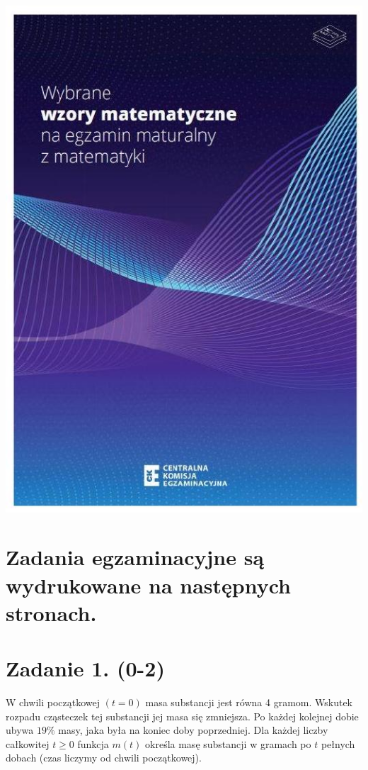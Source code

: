 \documentclass[10pt]{article}
\begin{document}
\begin{enumerate}
\includegraphics[max width=\textwidth, center]{2024_11_21_f1ecc00f5c4ab21f0d04g-02(1)}
\end{enumerate}

\section*{Zadania egzaminacyjne są wydrukowane na następnych stronach.}
\section*{Zadanie 1. (0-2)}
W chwili początkowej \((t=0)\) masa substancji jest równa 4 gramom. Wskutek rozpadu cząsteczek tej substancji jej masa się zmniejsza. Po każdej kolejnej dobie ubywa \(19 \%\) masy, jaka była na koniec doby poprzedniej. Dla każdej liczby całkowitej \(t \geq 0\) funkcja \(m(t)\) określa masę substancji w gramach po \(t\) pełnych dobach (czas liczymy od chwili początkowej).
\end{document}
